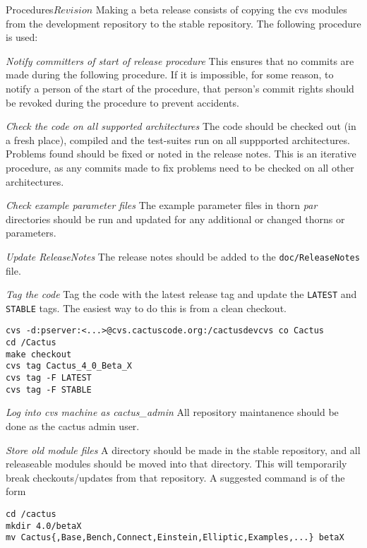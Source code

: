 \begin{cactuspart}{2}{Procedures}{}{$Revision$}
Making a beta release consists of copying the cvs modules from the
development repository to the stable repository.  The following
procedure is used:

\begin{Lentry}
\item[{\em Notify committers of start of release procedure}]
This ensures that no commits are made during the following procedure.
If it is impossible, for some reason, to notify a person of the start
of the procedure, that person's commit rights should be revoked during 
the procedure to prevent accidents.
\item[{\em Check the code on all supported architectures}]
The code should be checked out (in a fresh place), compiled and the
test-suites run on all suppported architectures.  Problems found
should be fixed or noted in the release notes.  This is an iterative
procedure, as any commits made to fix problems need to be checked on
all other architectures.
\item[{\em Check example parameter files}]
The example parameter files in thorn {\em par} directories should be
run and updated for any additional or changed thorns or parameters.
\item[{\em Update ReleaseNotes}]
The release notes should be added to the \verb|doc/ReleaseNotes| file.
\item[{\em Tag the code}]
Tag the code with the latest release tag and update the {\tt LATEST}
and {\tt STABLE} tags.  The easiest way to do this is from a clean
checkout.
\begin{verbatim}
cvs -d:pserver:<...>@cvs.cactuscode.org:/cactusdevcvs co Cactus
cd /Cactus
make checkout
cvs tag Cactus_4_0_Beta_X
cvs tag -F LATEST
cvs tag -F STABLE
\end{verbatim}

\item[{\em Log into cvs machine as cactus\_admin}]
All repository maintanence should be done as the cactus admin user.
\item[{\em Store old module files}]
A directory should be made in the stable repository, and all
releaseable modules should be moved into that directory.  This will
temporarily break checkouts/updates from that repository.  A suggested 
command is of the form

\begin{verbatim}
cd /cactus
mkdir 4.0/betaX
mv Cactus{,Base,Bench,Connect,Einstein,Elliptic,Examples,...} betaX
\end{verbatim}


\end{Lentry}
\end{cactuspart}
